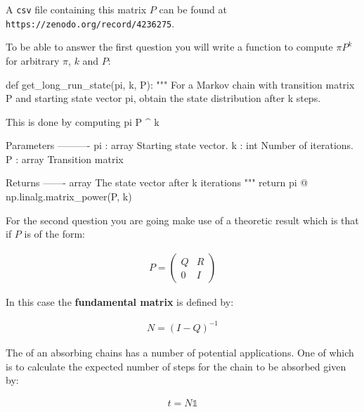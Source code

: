 A \texttt{csv} file containing this matrix \(P\) can be found at
\texttt{https://zenodo.org/record/4236275}.


To be able to answer the first question you will write a function to compute \(\pi
P ^ k\) for arbitrary \(\pi\), \(k\) and \(P\):

\begin{python}
def get_long_run_state(pi, k, P):
    """
    For a Markov chain with transition matrix P and starting state vector pi,
    obtain the state distribution after k steps.

    This is done by computing pi P ^ k

    Parameters
    ----------
    pi : array
        Starting state vector.
    k : int
        Number of iterations.
    P : array
        Transition matrix

    Returns
    -------
    array
        The state vector after k iterations
    """
    return pi @ np.linalg.matrix_power(P, k)
\end{python}





For the second question you are going make use of a theoretic result which is
that if \(P\) is of the form:

\begin{equation*}
\begin{split}
P = \begin{pmatrix}
        Q & R \\
        0 & I
    \end{pmatrix}
\end{split}
\end{equation*}

In this case the \textbf{fundamental matrix} is defined by:

\begin{equation*}
\begin{split}
    N = (I - Q) ^ {- 1}
\end{split}
\end{equation*}

The  of an absorbing  chains has a number of potential
applications. One of which is to calculate
the expected number of steps for the  chain to be absorbed given by:

\begin{equation*}
\begin{split}
    t = N\mathbb{1}
\end{split}
\end{equation*}

